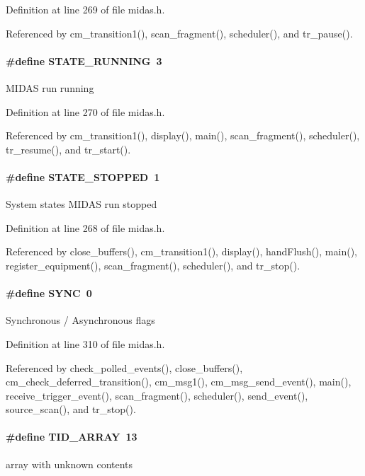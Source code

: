 Definition at line 269 of file midas.h.

Referenced by cm\_\-transition1(), scan\_\-fragment(), scheduler(), and tr\_\-pause().
\paragraph[{STATE\_\-RUNNING}]{\setlength{\rightskip}{0pt plus 5cm}\#define STATE\_\-RUNNING~3}\hfill\label{group__mdefineh_gac4c0304c569818c811515e24523c3150}
MIDAS run running 

Definition at line 270 of file midas.h.

Referenced by cm\_\-transition1(), display(), main(), scan\_\-fragment(), scheduler(), tr\_\-resume(), and tr\_\-start().
\paragraph[{STATE\_\-STOPPED}]{\setlength{\rightskip}{0pt plus 5cm}\#define STATE\_\-STOPPED~1}\hfill\label{group__mdefineh_ga6a8dac64367bd381245f2eb09a7fe919}
System states MIDAS run stopped 

Definition at line 268 of file midas.h.

Referenced by close\_\-buffers(), cm\_\-transition1(), display(), handFlush(), main(), register\_\-equipment(), scan\_\-fragment(), scheduler(), and tr\_\-stop().
\paragraph[{SYNC}]{\setlength{\rightskip}{0pt plus 5cm}\#define SYNC~0}\hfill\label{group__mdefineh_ga9ac82e856c7683e23553431e5224d5f4}
Synchronous / Asynchronous flags 

Definition at line 310 of file midas.h.

Referenced by check\_\-polled\_\-events(), close\_\-buffers(), cm\_\-check\_\-deferred\_\-transition(), cm\_\-msg1(), cm\_\-msg\_\-send\_\-event(), main(), receive\_\-trigger\_\-event(), scan\_\-fragment(), scheduler(), send\_\-event(), source\_\-scan(), and tr\_\-stop().
\paragraph[{TID\_\-ARRAY}]{\setlength{\rightskip}{0pt plus 5cm}\#define TID\_\-ARRAY~13}\hfill\label{group__mdefineh_gace0b097869238969f28899be5be86e42}
array with unknown contents 

